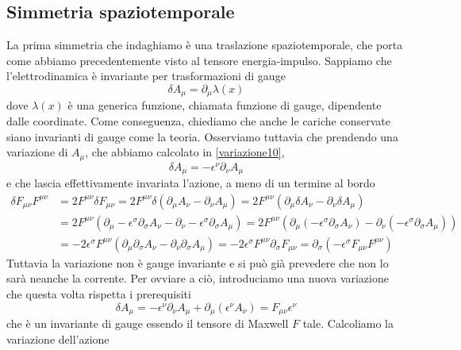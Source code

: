 \subsection{Simmetria spaziotemporale}
    La prima simmetria che indaghiamo è una traslazione spaziotemporale, che porta come abbiamo precedentemente visto al tensore energia-impulso. Sappiamo che l'elettrodinamica è invariante per trasformazioni di gauge 
\begin{equation*}
    \delta A_\mu = \partial_\mu \lambda(x)
\end{equation*}
    dove $\lambda(x)$ è una generica funzione, chiamata funzione di gauge, dipendente dalle coordinate. Come conseguenza, chiediamo che anche le cariche conservate siano invarianti di gauge come la teoria. Osserviamo tuttavia che prendendo una variazione di $A_\mu$, che abbiamo calcolato in \eqref{variazione10}, 
\begin{equation*}
    \delta A_\mu = - \epsilon^\nu \partial_\nu A_\mu
\end{equation*}
    e che lascia effettivamente invariata l'azione, a meno di un termine al bordo
\begin{equation*}
\begin{aligned}
    \delta F_{\mu\nu} F^{\mu\nu} & = 2 F^{\mu\nu} \delta F_{\mu\nu} = 2 F^{\mu\nu} \delta (\partial_\mu A_\nu - \partial_\nu A_\mu) = 2 F^{\mu\nu} ( \partial_\mu \delta A_\nu - \partial_\nu \delta A_\mu) \\ & = 2 F^{\mu\nu} ( \partial_\mu - \epsilon^\sigma \partial_\sigma A_\nu - \partial_\nu - \epsilon^\sigma \partial_\sigma A_\mu) = 2 F^{\mu\nu} ( \partial_\mu (- \epsilon^\sigma \partial_\sigma A_\nu) - \partial_\nu (- \epsilon^\sigma \partial_\sigma A_\mu)) \\ & = - 2 \epsilon^\sigma F^{\mu\nu} ( \partial_\mu \partial_\sigma A_\nu - \partial_\nu \partial_\sigma A_\mu) = - 2 \epsilon^\sigma F^{\mu\nu} \partial_\sigma F_{\mu\nu} = \partial_\sigma (-\epsilon^\sigma F_{\mu\nu} F^{\mu\nu})
\end{aligned}
\end{equation*}
    Tuttavia la variazione non è gauge invariante e si può già prevedere che non lo sarà neanche la corrente. Per ovviare a ciò, introduciamo una nuova variazione che questa volta rispetta i prerequisiti 
\begin{equation*}
    \delta A_\mu = - \epsilon^\nu \partial_\nu A_\mu + \partial_\mu (\epsilon^\nu A_\nu) = F_{\mu\nu} \epsilon^\nu
\end{equation*}
    che è un invariante di gauge essendo il tensore di Maxwell $F$ tale. Calcoliamo la variazione dell'azione
